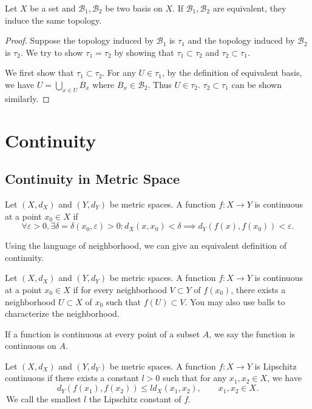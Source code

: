 \begin{theorem}
    Let $X$ be a set and $\mathcal{B}_1, \mathcal{B}_2$ be two basis on $X$. If $\mathcal{B}_1, \mathcal{B}_2$ are equivalent, they induce the same topology.
\end{theorem}
\begin{proof}
    Suppose the topology induced by $\mathcal{B}_1$ is $\tau_1$ and the topology induced by $\mathcal{B}_2$ is $\tau_2$. We try to show $\tau_1 = \tau_2$ by showing that $\tau_1 \subset \tau_2$ and $\tau_2 \subset \tau_1$.

    We first show that $\tau_1 \subset \tau_2$. For any $U \in \tau_{1}$, by the definition of equivalent basis, we have $U = \bigcup_{x\in U} B_x$ where $B_x \in \mathcal{B}_2$. Thus $U \in \tau_2$. $\tau_2 \subset \tau_1$ can be shown similarly.
\end{proof}


\section{Continuity}
\subsection{Continuity in Metric Space}
\begin{definition}
    Let $(X,d_X)$ and $(Y,d_Y)$ be metric spaces. A function $f: X \to Y$ is continuous at a point $x_0 \in X$ if 
    $$\forall \varepsilon > 0, \exists \delta = \delta(x_0,\varepsilon) > 0: d_X(x,x_0) < \delta \implies d_Y(f(x),f(x_0)) < \varepsilon.$$
\end{definition}


Using the language of neighborhood, we can give an equivalent definition of continuity.
\begin{proposition}
    Let $(X,d_X)$ and $(Y,d_Y)$ be metric spaces. A function $f: X \to Y$ is continuous at a point $x_0 \in X$ if for every neighborhood $V \subset Y$ of $f(x_0)$,
    there exists a neighborhood $U \subset X$ of $x_0$ such that $f(U) \subset V$. You may also use balls to characterize the neighborhood. 
\end{proposition}

If a function is continuous at every point of a subset $A$, we say the function is continuous on $A$. 
\begin{definition}
    Let $(X,d_X)$ and $(Y,d_Y)$ be metric spaces. A function $f: X \to Y$ is Lipschitz continuous if there exists a constant $l > 0$ such that for any $x_1,x_2 \in X$, we have
    $$d_Y(f(x_1),f(x_2)) \leq  l d_X(x_1,x_2),\qquad x_1,x_2 \in X.$$
\,We call the smallest $l$ the Lipschitz constant of $f$.
\end{definition}

